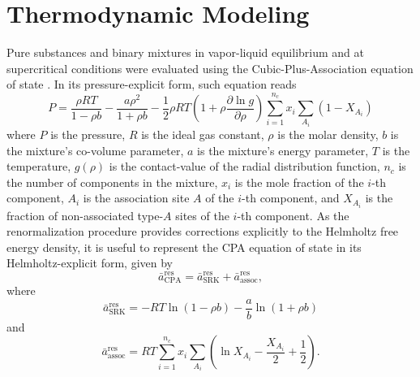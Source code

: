 \documentclass[preprint,12pt,3p]{elsarticle}
\begin{document}
\section{Thermodynamic Modeling}

Pure substances and binary mixtures in vapor-liquid equilibrium and at supercritical conditions were evaluated using the Cubic-Plus-Association equation of state \citep{kontogeorgis1996equation}.
In its pressure-explicit form, such equation reads
\begin{equation} \label{eq:pressure_cpa}
P = \frac{\rho RT}{1-\rho b}-\frac{a \rho^2}{1+\rho b}-\frac{1}{2} \rho RT \left(1+\rho\frac{\partial \ln g}{\partial \rho}\right)\sum_{i=1}^{n_c} x_{i} \sum_{A_{i}}(1-X_{A_{i}})
\end{equation}
where $P$ is the pressure,
$R$ is the ideal gas constant,
$\rho$ is the molar density,
$b$ is the mixture's co-volume parameter,
$a$ is the mixture's energy parameter,
$T$ is the temperature,
$g(\rho)$ is the contact-value of the radial distribution function,
$n_c$ is the number of components in the mixture,
$x_{i}$ is the mole fraction of the $i$-th component,
$A_{i}$ is the association site $A$ of the $i$-th component, and
$X_{A_{i}}$ is the fraction of non-associated type-$A$ sites of the $i$-th component.
As the renormalization procedure provides corrections explicitly to the Helmholtz free energy density, it is useful to represent the CPA equation of state in its Helmholtz-explicit form, given by
\begin{equation} \label{eq:helm_res_cpa}
\bar{a}_\text{CPA}^\text{res} =\bar{a}_\text{SRK}^\text{res} + \bar{a}_\text{assoc}^\text{res},
\end{equation}
where
\begin{equation} \label{eq:helm_res_srk}
\bar{a}_\text{SRK}^\text{res} = -RT\ln(1-\rho b)-\frac{a}{b}\ln(1+\rho b)   
\end{equation}
and
\begin{equation} \label{eq:helm_res_assoc}
\bar{a}_\text{assoc}^\text{res} = RT\sum_{i=1}^{n_c} x_{i} \sum_{A_{i}}\left(\ln X_{A_{i}} - \frac{X_{A_{i}}}{2} + \frac{1}{2}\right).
\end{equation}
\end{document}
